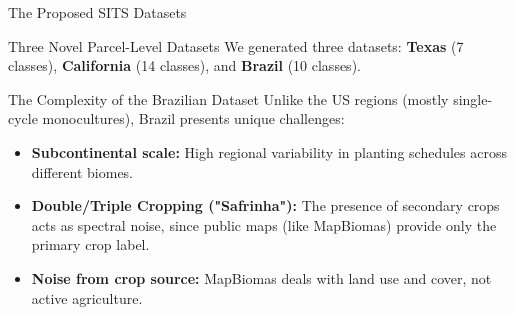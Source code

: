 \begin{frame}{The Proposed SITS Datasets}
    \begin{block}{Three Novel Parcel-Level Datasets}
        We generated three datasets: \textbf{Texas} (7 classes), \textbf{California} (14 classes), and \textbf{Brazil} (10 classes).
    \end{block}
    \pause
    \begin{block}{The Complexity of the Brazilian Dataset}
        Unlike the US regions (mostly single-cycle monocultures), Brazil presents unique challenges:
        \begin{itemize}
            \item \textbf{Subcontinental scale:} High regional variability in planting schedules across different biomes.
            \item \textbf{Double/Triple Cropping ("Safrinha"):} The presence of secondary crops acts as spectral noise, since public maps (like MapBiomas) provide only the primary crop label.
            \item \textbf{Noise from crop source:} MapBiomas deals with land use and cover, not active agriculture. 
        \end{itemize}
    \end{block}
\end{frame}


